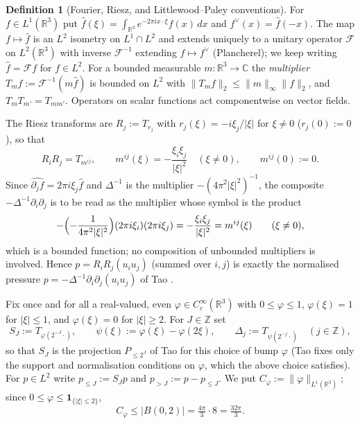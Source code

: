 \documentclass[11pt]{article}
\theoremstyle{definition}
\newtheorem{definition}[theorem]{Definition}
\theoremstyle{plain}
\newcommand{\R}{\mathbb R}
\newcommand{\norm}[1]{\lVert #1\rVert}
\begin{document}
\begin{definition}[Fourier, Riesz, and Littlewood--Paley conventions]
\label{def:lp}
For $f\in L^1(\R^3)$ put $\hat f(\xi)=\int_{\R^3}e^{-2\pi ix\cdot\xi}f(x)\,dx$
and $f^\vee(x)=\hat f(-x)$.  The map $f\mapsto\hat f$ is an $L^2$ isometry
on $L^1\cap L^2$ and extends uniquely to a unitary operator
$\mathcal F$ on $L^2(\R^3)$ with inverse $\mathcal F^{-1}$ extending
$f\mapsto f^\vee$ (Plancherel); we keep writing $\hat f=\mathcal Ff$ for
$f\in L^2$.  For a bounded measurable $m:\R^3\to\mathbb C$ the
\emph{multiplier} $T_m f:=\mathcal F^{-1}(m\hat f)$ is bounded on $L^2$ with
$\norm{T_mf}_2\le\norm m_\infty\norm f_2$, and $T_mT_{m'}=T_{mm'}$.
Operators on scalar functions act componentwise on vector fields.

The Riesz transforms are $R_j:=T_{r_j}$ with $r_j(\xi)=-i\xi_j/|\xi|$ for
$\xi\ne0$ ($r_j(0):=0$), so that
\begin{equation}\label{eq:riesz-symbol}
 R_iR_j=T_{m^{ij}},\qquad m^{ij}(\xi)=-\frac{\xi_i\xi_j}{|\xi|^2}\quad(\xi\ne0),
 \qquad m^{ij}(0):=0 .
\end{equation}
Since $\widehat{\partial_jf}=2\pi i\xi_j\hat f$ and $\Delta^{-1}$ is the
multiplier $-(4\pi^2|\xi|^2)^{-1}$, the composite
$-\Delta^{-1}\partial_i\partial_j$ is to be read as the multiplier whose
symbol is the product
\[
 -\Bigl(-\frac{1}{4\pi^2|\xi|^2}\Bigr)(2\pi i\xi_i)(2\pi i\xi_j)
 =-\frac{\xi_i\xi_j}{|\xi|^2}=m^{ij}(\xi)\qquad(\xi\ne0),
\]
which is a bounded function; no composition of unbounded multipliers is
involved.  Hence $p=R_iR_j(u_iu_j)$ (summed over $i,j$) is
exactly the normalised pressure $p=-\Delta^{-1}\partial_i\partial_j(u_iu_j)$ of
Tao \cite[eq.~(9)]{Tao2013}.

Fix once and for all a real-valued, even
$\varphi\in C_c^\infty(\R^3)$ with $0\le\varphi\le1$, $\varphi(\xi)=1$ for
$|\xi|\le1$, and $\varphi(\xi)=0$ for $|\xi|\ge2$.  For $J\in\mathbb Z$ set
\begin{equation}\label{eq:lp-symbol}
 S_J:=T_{\varphi(2^{-J}\cdot)},\qquad
 \psi(\xi):=\varphi(\xi)-\varphi(2\xi),\qquad
 \Delta_j:=T_{\psi(2^{-j}\cdot)}\quad(j\in\mathbb Z),
\end{equation}
so that $S_J$ is the projection $P_{\le 2^J}$ of Tao \cite[p.~40]{Tao2013}
for this choice of bump $\varphi$ (Tao fixes only the support and normalisation
conditions on $\varphi$, which the above choice satisfies).  For $p\in L^2$ write
$p_{\le J}:=S_Jp$ and $p_{>J}:=p-p_{\le J}$.  We put
$C_\varphi:=\norm\varphi_{L^1(\R^3)}$; since $0\le\varphi\le\mathbf 1_{\{|\xi|\le2\}}$,
\[
 C_\varphi\le|B(0,2)|=\tfrac{4\pi}3\cdot 8=\tfrac{32\pi}3 .
\]
\end{definition}
\end{document}
